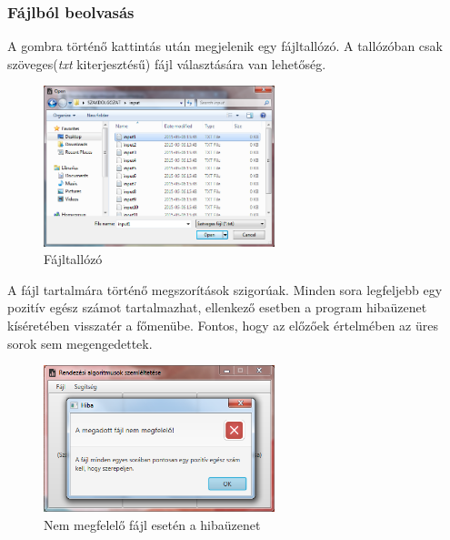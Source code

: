 \documentclass{elteikthesis}
\begin{document}
\subsubsection{Fájlból beolvasás}
A gombra történő kattintás után megjelenik egy fájltallózó. A tallózóban csak szöveges(\emph{txt} kiterjesztésű) fájl választására van lehetőség.
\begin{figure}[H]
	\centering
	\includegraphics[width=0.6\textwidth]{pics/fileinput.png}
	\caption{Fájltallózó}
\end{figure}
 A fájl tartalmára történő megszorítások szigorúak. Minden sora legfeljebb egy pozitív egész számot tartalmazhat, ellenkező esetben a program hibaüzenet kíséretében visszatér a főmenübe. Fontos, hogy az előzőek értelmében az üres sorok sem megengedettek.
 \begin{figure}[H]
 	\centering
 	\includegraphics[width=0.6\textwidth]{pics/fileinput_error.png}
 	\caption{Nem megfelelő fájl esetén a hibaüzenet}
 \end{figure}
\end{document}

